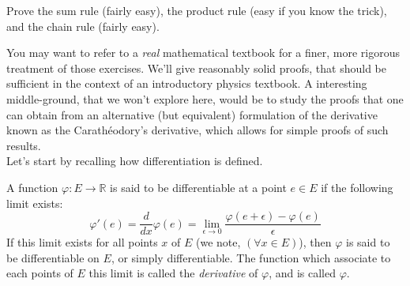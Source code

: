 \documentclass[solutions.tex]{subfiles}
\begin{document}
\maketitle
\begin{exercise} Prove the sum rule (fairly easy), the
product rule (easy if you know the trick), and the chain rule
(fairly easy).
\end{exercise}
You may want to refer to a \textit{real} mathematical textbook for a
finer, more rigorous treatment of those exercises. We'll give reasonably
solid proofs, that should be sufficient in the context of an
introductory physics textbook. A interesting middle-ground, that we won't
explore here, would be to study the proofs that one can obtain from an
alternative (but equivalent) formulation of the derivative known as the
Carathéodory's derivative, which allows for simple proofs of such results. \\

Let's start by recalling how differentiation is defined.

\begin{definition} A function $\varphi : E \rightarrow \mathbb{R}$ is
said to be differentiable at a point $e\in E$ if the following limit exists:
\[
	\varphi'(e) = \frac{d}{dx}\varphi(e) =
		\boxed{\lim_{\epsilon \rightarrow 0}\frac{\varphi(e+\epsilon)-\varphi(e)}{\epsilon}}
\]
If this limit exists for all points $x$ of $E$ (we note, $(\forall x \in E)$), then
$\varphi$ is said to be differentiable on $E$, or simply differentiable. The function
which associate to each points of $E$ this limit is called the \textit{derivative}
of $\varphi$, and is called $\varphi$.
\end{definition}
\end{document}
